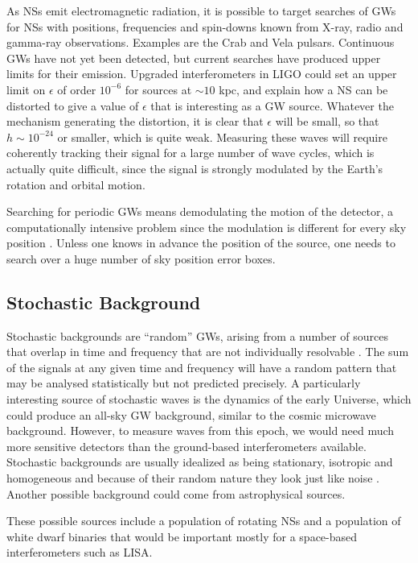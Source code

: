 \documentclass[binding=0.6cm, LaM]{sapthesis}
\begin{document}
	As NSs emit electromagnetic radiation, 
	it is possible to target searches of GWs for NSs with positions, 
	frequencies and spin-downs known from X-ray, radio and gamma-ray observations. 
	Examples are the Crab and Vela pulsars. 
	Continuous GWs have not yet been detected, 
	but current searches have produced upper limits for their emission. 
	Upgraded interferometers in LIGO could set an upper limit on
	$\epsilon$ of order $10^{-6}$ for sources at $\sim10$ kpc, 
	and explain how a NS can be distorted to give a value of $\epsilon$ that is interesting as a GW source. 
	Whatever the mechanism generating the distortion, 
	it is clear that $\epsilon$ will be small,
	so that $h \sim 10^{-24}$ or smaller, which is quite weak. 
	Measuring these waves will require
	coherently tracking their signal for a large number of wave cycles, 
	which is actually quite difficult, 
	since the signal is strongly modulated by the Earth’s rotation and orbital motion.

	Searching for periodic GWs means demodulating the motion of the detector, 
	a computationally intensive problem since the modulation is different for every sky position \cite{4}. 
	Unless one knows in advance the position of the source, 
	one needs to search over a huge number of sky position error boxes.

\subsection{Stochastic Background}
	Stochastic backgrounds are “random” GWs, 
	arising from a number of sources that overlap 
	in time and frequency that are not individually resolvable \cite{22}. 
	The sum of the signals at any given time and frequency will have 
	a random pattern that may be analysed statistically but not predicted precisely.
	A particularly interesting source of stochastic waves is the dynamics of the early Universe, 
	which could produce an all-sky GW background, 
	similar to the cosmic microwave background.
	However, to measure waves from this epoch, 
	we would need much more sensitive detectors than the ground-based interferometers available.
	Stochastic backgrounds are usually idealized as being stationary, 
	isotropic and homogeneous and because of their random nature they look just like noise \cite{4}.	
	Another possible background could come from astrophysical sources.

	These possible sources include a population of rotating NSs 
	and a population of white dwarf binaries that would be important mostly for a space-based interferometers such as LISA. 
\end{document}
